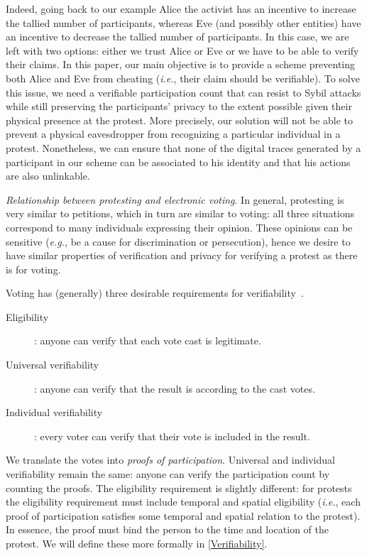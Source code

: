 Indeed, going back to our example Alice the activist has an incentive to increase the tallied number of participants, whereas Eve (and possibly other entities) have an incentive to decrease the tallied number of participants.
In this case, we are left with two options: either we trust Alice or Eve or we have to be able to verify their claims.
In this paper, our main objective is to provide a scheme preventing both Alice and Eve from cheating (\emph{i.e.}, their claim should be verifiable).
To solve this issue, we need a verifiable participation count that can resist to Sybil attacks while still preserving the participants'
privacy to the extent possible given their physical presence at the protest. 
More precisely, our solution will not be able to prevent a physical eavesdropper from recognizing a particular individual in a protest. 
Nonetheless, we can ensure that none of the digital traces generated by a participant in our scheme can be associated to his identity and that his actions are also unlinkable.

\emph{Relationship between protesting and electronic voting}. In general, protesting is very similar to petitions, which in turn are similar to voting: all three situations correspond to many individuals expressing their opinion.
These opinions can be sensitive (\emph{e.g.}, be a cause for discrimination or persecution), hence we desire to have similar properties of verification and privacy for verifying a protest as there is for voting.

Voting has (generally) three desirable requirements for verifiability~\cite{VerifyingPrivacyPropertiesOfVotingProtocols}.
\begin{description}
  \item[Eligibility]: anyone can verify that each vote cast is legitimate.
  \item[Universal verifiability]: anyone can verify that the result is according to the cast votes.
  \item[Individual verifiability]: every voter can verify that their vote is included in the result.
\end{description}
We translate the votes into \emph{proofs of participation}.
Universal and individual verifiability remain the same: anyone can verify the participation count by counting the proofs.
The eligibility requirement is slightly different: for protests the eligibility requirement must include temporal and spatial 
eligibility (\emph{i.e.}, each proof of participation satisfies some temporal and spatial relation to the protest).
In essence, the proof must bind the person to the time and location of the protest.
We will define these more formally in \cref{Verifiability}.

